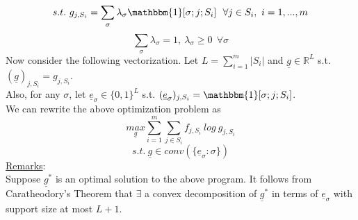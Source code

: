 \documentclass[11pt]{article}
\begin{document}
$$s.t.\ g_{j,S_i}=\sum_{\sigma}\lambda_{\sigma}\mathbbm{1}[\sigma;j;S_i]\ \ \forall j\in S_i,\ i=1,...,m$$
$$\sum_{\sigma}\lambda_{\sigma}=1,\ \lambda_{\sigma}\geq0\ \ \forall \sigma$$
Now consider the following vectorization. Let $L=\sum_{i=1}^m|S_i|$ and $\underline{g}\in \mathbb{R}^L$ s.t. $(\underline{g})_{j,S_i}=g_{j,S_i}$.\\
Also, for any $\sigma$, let $\underline{e}_{\sigma}\in\{0,1\}^L$ s.t. $(\underline{e}_{\sigma})_{j,S_i}=\mathbbm{1}[\sigma;j;S_i]$.\\
We can rewrite the above optimization problem as
$$\underset{\underline{g}}{max}\sum_{i=1}^m\sum_{j\in S_i} f_{j,S_i}\ log\ g_{j,S_i}$$
$$s.t.\ \underline{g} \in conv(\{\underline{e}_{\sigma}:\sigma\})$$
\underline{Remarks}:\\
Suppose $\underline{g}^{*}$ is an optimal solution to the above program. It follows from Caratheodory's Theorem that $\exists$ a convex decomposition of $\underline{g}^{*}$ in terms of $\underline{e}_{\sigma}$ with support size at most $L+1$.
\end{document}
